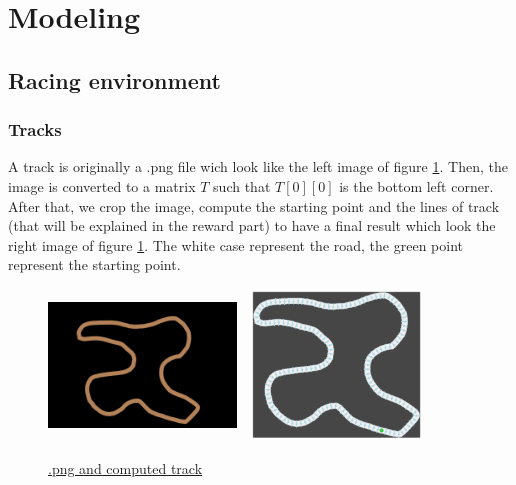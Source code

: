 \documentclass[11pt,a4paper]{article}
\newcounter{fig}
\begin{document}
	\section*{Modeling}
		\subsection*{Racing environment}
			\subsubsection*{Tracks}
A track is originally a .png file wich look like the left image of figure \ref{figure:track}. Then, the image is converted to a matrix $T$ such that $T[0][0]$ is the bottom left corner. After that, we crop the image, compute the starting point and the lines of track (that will be explained in the reward part) to have a final result which look the right image of figure \ref{figure:track}. The white case represent the road, the green point represent the starting point.
\begin{center}
	\begin{figure}[ht]
		\centering
		\includegraphics[width=5cm, height=4cm]{track_06.png}
		\includegraphics[width=5cm, height=4cm]{track_06_computed.png}
		\caption{\underline{.png and computed track}}
		\label{figure:track}
	\end{figure}
\end{center}

	
\end{document}
